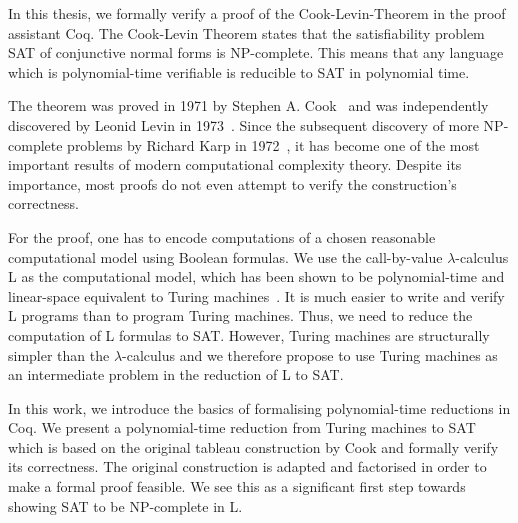 In this thesis, we formally verify a proof of the Cook-Levin-Theorem in the proof assistant Coq.
The Cook-Levin Theorem states that the satisfiability problem SAT of conjunctive normal forms is NP-complete. 
This means that any language which is polynomial-time verifiable is reducible to SAT in polynomial time. 

The theorem was proved in 1971 by Stephen A. Cook~\cite{cook_theorem} and was independently discovered by Leonid Levin in 1973~\cite{levin_theorem}.
Since the subsequent discovery of more NP-complete problems by Richard Karp in 1972~\cite{Karp1972}, it has become one of the most important results of modern computational complexity theory.
Despite its importance, most proofs do not even attempt to verify the construction's correctness.

For the proof, one has to encode computations of a chosen reasonable computational model using Boolean formulas. 
We use the call-by-value $\lambda$-calculus L as the computational model, which has been shown to be polynomial-time and linear-space equivalent to Turing machines~\cite{ForsterKunzeRoth:2019:wcbv-Reasonable}. It is much easier to write and verify L programs than to program Turing machines.
Thus, we need to reduce the computation of L formulas to SAT.
However, Turing machines are structurally simpler than the $\lambda$-calculus and we therefore propose to use Turing machines as an intermediate problem in the reduction of L to SAT.


In this work, we introduce the basics of formalising polynomial-time reductions in Coq. We present a polynomial-time reduction from Turing machines to SAT which is based on the original tableau construction by Cook and formally verify its correctness. The original construction is adapted and factorised in order to make a formal proof feasible. We see this as a significant first step towards showing SAT to be NP-complete in L.

